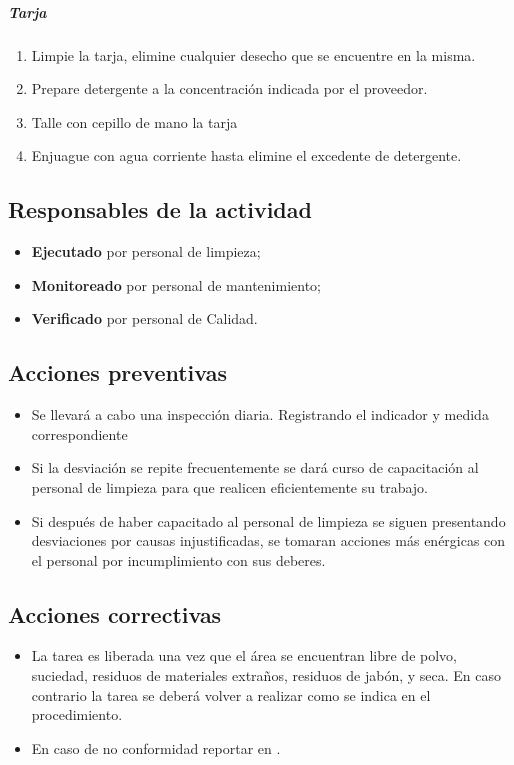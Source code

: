 \subparagraph{Tarja}

\begin{enumerate}
	\item Limpie la tarja, elimine cualquier desecho que se encuentre en la misma.
	\item Prepare detergente a la concentración indicada por el proveedor.
	\item Talle con cepillo de mano la tarja
	\item Enjuague con agua corriente hasta elimine el excedente de detergente.
\end{enumerate}

\subsection{Responsables de la actividad}

\begin{itemize}
	\item \textbf{Ejecutado} por personal de limpieza;
	\item \textbf{Monitoreado} por personal de mantenimiento;
	\item \textbf{Verificado} por personal de Calidad.
\end{itemize}

\subsection{Acciones preventivas}

\begin{itemize}
	\item Se llevará a cabo una inspección diaria. Registrando el indicador y medida correspondiente
	\item Si la desviación se repite frecuentemente se dará curso de capacitación al personal de limpieza para que realicen eficientemente su trabajo.
	\item Si después de haber capacitado al personal de limpieza se siguen presentando desviaciones por causas injustificadas, se tomaran acciones más enérgicas con el personal por incumplimiento con sus deberes.
\end{itemize}

\subsection{Acciones correctivas}

\begin{itemize}
	\item La tarea es liberada una vez que el área se encuentran libre de polvo, suciedad, residuos de materiales extraños, residuos de jabón, y seca. En caso contrario la tarea se deberá volver a realizar como se indica en el procedimiento.
	\item En caso de no conformidad reportar en \RAC.
\end{itemize}

